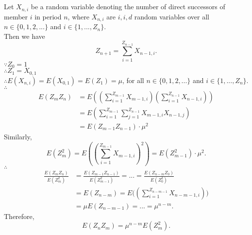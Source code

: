 \documentclass{article}
\begin{document}
\section{}
Let $X_{n, i}$ be a random variable denoting the number of direct successors of member $i$ in period $n$, where $X_{n, i}$ are $i, i, d$ random variables over all $n \in {\{0, 1, 2, ...\}}$ and $i \in {\{1, ..., Z_n\}}$. \\
Then we have
\begin{equation*}
    Z_{n+1} = \sum\limits_{i=1}^{Z_{n-1}} X_{n-1, i}.
\end{equation*}
$\because Z_0 = 1$ \\
$\therefore Z_1 = X_{0, 1}$ \\
$\therefore E(X_{n, i}) = E(X_{0, 1}) = E(Z_1) = \mu$, for all $n \in {\{0, 1, 2, ...\}}$ and $i \in {\{1, ..., Z_n\}}$.\\
$\therefore$
\begin{align*}
    E(Z_m Z_n) &= E((\sum\limits_{i=1}^{Z_{m-1}} X_{m-1, i})(\sum\limits_{i=1}^{Z_{n-1}} X_{n-1, i})) \\
    &= E(\sum\limits_{i=1}^{Z_{m-1}} \sum\limits_{j=1}^{Z_{n-1}} X_{m-1, i} X_{n-1, j}) \\
    &= E(Z_{m-1} Z_{n-1}) \cdot \mu^2
\end{align*}
Similarly, 
\begin{equation*}
    E(Z_m^2) = E((\sum\limits_{i=1}^{Z_{m-1}} X_{m-1, i})^2) = E(Z_{m-1}^2) \cdot \mu^2. 
\end{equation*}
$\therefore$
\begin{align*}
    \frac{E(Z_m Z_n)}{E(Z_m^2)} &= \frac{E(Z_{m-1} Z_{n-1})}{E(Z_{m-1}^2)} = ... = \frac{E(Z_{n-m} Z_0)}{E(Z_0^2)} \\
    &= E(Z_{n-m}) = E\big((\sum\limits_{i=1}^{Z_{n-m-1}} X_{n-m-1, i})\big) \\
    &= \mu E(Z_{n-m-1}) = ... = \mu ^{n - m}.
\end{align*}
Therefore, 
\begin{equation*}
    E(Z_n Z_m) = \mu^{n-m} E(Z_m^2).
\end{equation*}
\end{document}
